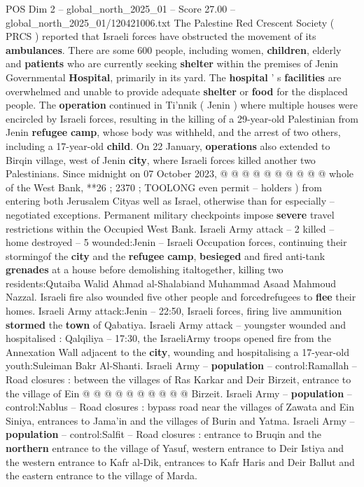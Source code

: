 \begin{textsample}{POS Dim 2 – global\_north\_2025\_01 – Score 27.00 – global\_north\_2025\_01/120421006.txt}
The Palestine Red Crescent Society ( PRCS ) reported that Israeli forces have obstructed the movement of its \textbf{ambulances}.
There are some 600 people, including women, \textbf{children}, elderly and \textbf{patients} who are currently seeking \textbf{shelter} within the premises of Jenin Governmental \textbf{Hospital}, primarily in its yard.
The \textbf{hospital} ' s \textbf{facilities} are overwhelmed and unable to provide adequate \textbf{shelter} or \textbf{food} for the displaced people.
The \textbf{operation} continued in Ti'nnik ( Jenin ) where multiple houses were encircled by Israeli forces, resulting in the killing of a 29-year-old Palestinian from Jenin \textbf{refugee} \textbf{camp}, whose body was withheld, and the arrest of two others, including a 17-year-old \textbf{child}.
On 22 January, \textbf{operations} also extended to Birqin village, west of Jenin \textbf{city}, where Israeli forces killed another two Palestinians.
Since midnight on 07 October 2023, @ @ @ @ @ @ @ @ @ @ whole of the West Bank, **26 ; 2370 ; TOOLONG even permit -- holders ) from entering both Jerusalem Cityas well as Israel, otherwise than for especially -- negotiated exceptions.
Permanent military checkpoints impose \textbf{severe} travel restrictions within the Occupied West Bank.
Israeli Army attack -- 2 killed -- home destroyed -- 5 wounded:Jenin -- Israeli Occupation forces, continuing their stormingof the \textbf{city} and the \textbf{refugee} \textbf{camp}, \textbf{besieged} and fired anti-tank \textbf{grenades} at a house before demolishing italtogether, killing two residents:Qutaiba Walid Ahmad al-Shalabiand Muhammad Asaad Mahmoud Nazzal.
Israeli fire also wounded five other people and forcedrefugees to \textbf{flee} their homes.
Israeli Army attack:Jenin -- 22:50, Israeli forces, firing live ammunition \textbf{stormed} the \textbf{town} of Qabatiya.
Israeli Army attack -- youngster wounded and hospitalised : Qalqiliya -- 17:30, the IsraeliArmy troops opened fire from the Annexation Wall adjacent to the \textbf{city}, wounding and hospitalising a 17-year-old youth:Suleiman Bakr Al-Shanti.
Israeli Army -- \textbf{population} -- control:Ramallah -- Road closures : between the villages of Ras Karkar and Deir Birzeit, entrance to the village of Ein @ @ @ @ @ @ @ @ @ @ Birzeit.
Israeli Army -- \textbf{population} -- control:Nablus -- Road closures : bypass road near the villages of Zawata and Ein Siniya, entrances to Jama'in and the villages of Burin and Yatma.
Israeli Army -- \textbf{population} -- control:Salfit -- Road closures : entrance to Bruqin and the \textbf{northern} entrance to the village of Yasuf, western entrance to Deir Istiya and the western entrance to Kafr al-Dik, entrances to Kafr Haris and Deir Ballut and the eastern entrance to the village of Marda.

\end{textsample}
